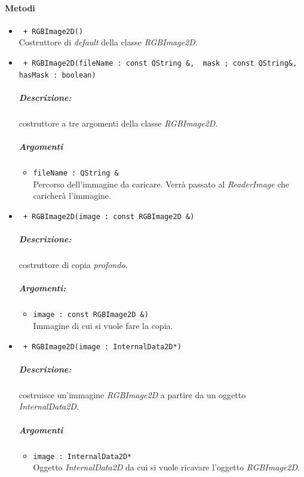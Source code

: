 \paragraph{Metodi }
	\begin{itemize}
		\item \color{blue}\verb! + RGBImage2D()! \\
		\color{black} Costruttore di \emph{default} della classe \textsl{RGBImage2D}.
		
		\item \color{blue}\verb! + RGBImage2D(fileName : const QString &,  mask ; const QString&,!\\
								   \verb!hasMask : boolean)! 
			\color{black} 
			\subparagraph{Descrizione:} costruttore a tre argomenti della classe \textsl{RGBImage2D}.	
			\subparagraph{Argomenti}
			\begin{itemize}
				\item \color{RoyalPurple}\verb!fileName : QString &! \\
				\color{black}Percorso dell'immagine da caricare. Verrà passato al \textit{ReaderImage} che caricherà l'immagine.
			\end{itemize}
			
		\item \color{blue}\verb! + RGBImage2D(image : const RGBImage2D &)!\\
		\color{black}
		\subparagraph{Descrizione:} costruttore di copia \emph{profondo}.
		\subparagraph{Argomenti:}
			\begin{itemize}
				\item \color{RoyalPurple}\verb!image : const RGBImage2D &)!\\
				\color{black}Immagine di cui si vuole fare la copia.
			\end{itemize}
		
		\item \color{blue}\verb! + RGBImage2D(image : InternalData2D*)!\\
		\color{black}
		\subparagraph{Descrizione:} costruisce un'immagine \textsl{RGBImage2D} a partire da un oggetto \textsl{InternalData2D}.
		\subparagraph{Argomenti}
			\begin{itemize}
				\item \color{RoyalPurple}\verb!image : InternalData2D*!\\
				\color{black}Oggetto \textsl{InternalData2D} da cui si vuole ricavare l'oggetto \textsl{RGBImage2D}.
			\end{itemize}
			

\end{itemize}
